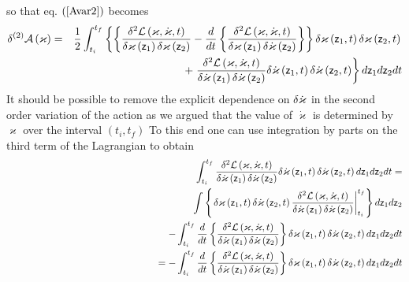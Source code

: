so that eq. $\left( \ref{Avar2}\right) $ becomes 
\begin{eqnarray}
\delta ^{\left( 2\right) }{\cal A}\left( \varkappa \right) &=&\frac{1}{2}%
\int_{t_{i}}^{t_{f}}\left\{ \left\{ \frac{\delta ^{2}{\cal L}\left( {\cal %
\varkappa },{\cal \dot{\varkappa}},t\right) }{\delta \varkappa \left( {\sf z}%
_{1}\right) \delta \varkappa \left( {\sf z}_{2}\right) }-\frac{d}{dt}\left\{ 
\frac{\delta ^{2}{\cal L}\left( \varkappa ,\dot{\varkappa},t\right) }{\delta
\varkappa \left( {\sf z}_{1}\right) \delta \dot{\varkappa}\left( {\sf z}%
_{2}\right) }\right\} \right\} \delta \varkappa \left( {\sf z}_{1},t\right)
\delta \varkappa \left( {\sf z}_{2},t\right) \right.  \nonumber \\
&&\qquad \qquad \qquad \qquad \qquad +\left. \frac{\delta ^{2}{\cal L}\left( 
{\cal \varkappa },{\cal \dot{\varkappa}},t\right) }{\delta \dot{\varkappa}%
\left( {\sf z}_{1}\right) \delta \dot{\varkappa}\left( {\sf z}_{2}\right) }%
\delta \dot{\varkappa}\left( {\sf z}_{1},t\right) \delta \dot{\varkappa}%
\left( {\sf z}_{2},t\right) \right\} d{\sf z}_{1}d{\sf z}_{2}dt
\label{Avar2a}
\end{eqnarray}%
It should be possible to remove the explicit dependence on $\delta \dot{%
\varkappa}$ in the second order variation of the action as we argued that
the value of $\dot{\varkappa}$ is determined by $\varkappa $ over the
interval $\left( t_{i},t_{f}\right) $ To this end one can use integration by
parts on the third term of the Lagrangian to obtain 
\begin{eqnarray}
&&\int_{t_{i}}^{t_{f}}\frac{\delta ^{2}{\cal L}\left( {\cal \varkappa },%
{\cal \dot{\varkappa}},t\right) }{\delta \dot{\varkappa}\left( {\sf z}%
_{1}\right) \delta \dot{\varkappa}\left( {\sf z}_{2}\right) }\delta \dot{%
\varkappa}\left( {\sf z}_{1},t\right) \delta \dot{\varkappa}\left( {\sf z}%
_{2},t\right) d{\sf z}_{1}d{\sf z}_{2}dt=  \nonumber \\
&&\int \left\{ \left. \delta \varkappa \left( {\sf z}_{1},t\right) \delta 
\dot{\varkappa}\left( {\sf z}_{2},t\right) \frac{\delta ^{2}{\cal L}\left( 
{\cal \varkappa },{\cal \dot{\varkappa}},t\right) }{\delta \dot{\varkappa}%
\left( {\sf z}_{1}\right) \delta \dot{\varkappa}\left( {\sf z}_{2}\right) }%
\right| _{t_{i}}^{t_{f}}\right\} d{\sf z}_{1}d{\sf z}_{2}  \nonumber \\
&&\qquad \qquad \qquad \qquad \qquad -\int_{t_{i}}^{t_{f}}\frac{d}{dt}%
\left\{ \frac{\delta ^{2}{\cal L}\left( \varkappa ,\dot{\varkappa},t\right) 
}{\delta \dot{\varkappa}\left( {\sf z}_{1}\right) \delta \dot{\varkappa}%
\left( {\sf z}_{2}\right) }\right\} \delta \varkappa \left( {\sf z}%
_{1},t\right) \delta \dot{\varkappa}\left( {\sf z}_{2},t\right) d{\sf z}_{1}d%
{\sf z}_{2}dt  \nonumber \\
&&\left. {}\right. \qquad \qquad \qquad \qquad \qquad \qquad \qquad
=-\int_{t_{i}}^{t_{f}}\frac{d}{dt}\left\{ \frac{\delta ^{2}{\cal L}\left(
\varkappa ,\dot{\varkappa},t\right) }{\delta \dot{\varkappa}\left( {\sf z}%
_{1}\right) \delta \dot{\varkappa}\left( {\sf z}_{2}\right) }\right\} \delta
\varkappa \left( {\sf z}_{1},t\right) \delta \dot{\varkappa}\left( {\sf z}%
_{2},t\right) d{\sf z}_{1}d{\sf z}_{2}dt
\end{eqnarray}%
